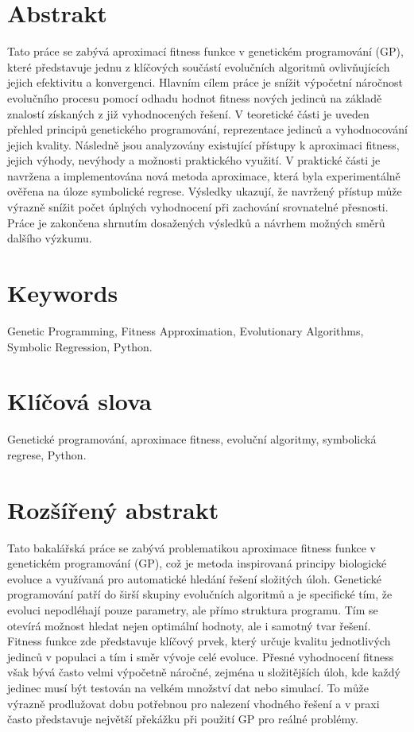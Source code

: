 \documentclass[12pt,a4paper]{report}
\begin{document}
\section*{Abstrakt}
Tato práce se zabývá aproximací fitness funkce v genetickém programování (GP), které představuje jednu z klíčových součástí evolučních algoritmů ovlivňujících jejich efektivitu a konvergenci. Hlavním cílem práce je snížit výpočetní náročnost evolučního procesu pomocí odhadu hodnot fitness nových jedinců na základě znalostí získaných z již vyhodnocených řešení.
V teoretické části je uveden přehled principů genetického programování, reprezentace jedinců a vyhodnocování jejich kvality. Následně jsou analyzovány existující přístupy k aproximaci fitness, jejich výhody, nevýhody a možnosti praktického využití.
V praktické části je navržena a implementována nová metoda aproximace, která byla experimentálně ověřena na úloze symbolické regrese. Výsledky ukazují, že navržený přístup může výrazně snížit počet úplných vyhodnocení při zachování srovnatelné přesnosti. Práce je zakončena shrnutím dosažených výsledků a návrhem možných směrů dalšího výzkumu.

\section*{Keywords}
Genetic Programming, Fitness Approximation, Evolutionary Algorithms, Symbolic Regression, Python.

\section*{Klíčová slova}
Genetické programování, aproximace fitness, evoluční algoritmy, symbolická regrese, Python.

\newpage
\section*{Rozšířený abstrakt}

Tato bakalářská práce se zabývá problematikou aproximace fitness funkce v genetickém programování (GP), což je metoda inspirovaná principy biologické evoluce a využívaná pro automatické hledání řešení složitých úloh. Genetické programování patří do širší skupiny evolučních algoritmů a je specifické tím, že evoluci nepodléhají pouze parametry, ale přímo struktura programu. Tím se otevírá možnost hledat nejen optimální hodnoty, ale i samotný tvar řešení. Fitness funkce zde představuje klíčový prvek, který určuje kvalitu jednotlivých jedinců v populaci a tím i směr vývoje celé evoluce. Přesné vyhodnocení fitness však bývá často velmi výpočetně náročné, zejména u složitějších úloh, kde každý jedinec musí být testován na velkém množství dat nebo simulací. To může výrazně prodlužovat dobu potřebnou pro nalezení vhodného řešení a v praxi často představuje největší překážku při použití GP pro reálné problémy.  
\end{document}
